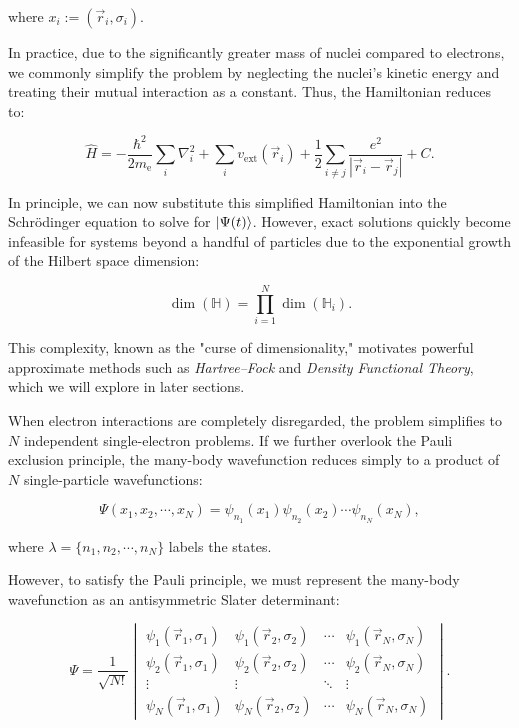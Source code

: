 where $x_i:=(\vec{r}_i,\sigma_i)$.

In practice, due to the significantly greater mass of nuclei compared to electrons, we commonly simplify the problem by neglecting the nuclei’s kinetic energy and treating their mutual interaction as a constant. Thus, the Hamiltonian reduces to:

\begin{equation}
    \hat{H}=-\frac{\hbar^2}{2m_\mathrm{e}}\sum_i\nabla_i^2
    +\sum_i v_\text{ext}(\vec{r}_i)
    +\frac{1}{2}\sum_{i\neq j}\frac{e^2}{|\vec{r}_i-\vec{r}_j|}+C.
    \label{many_body_hamiltonian_simplified}
\end{equation}

In principle, we can now substitute this simplified Hamiltonian into the Schrödinger equation to solve for $\ket{\Psi(t)}$. However, exact solutions quickly become infeasible for systems beyond a handful of particles due to the exponential growth of the Hilbert space dimension:

\begin{equation}
    \dim(\mathbb{H})=\prod_{i=1}^{N} \dim(\mathbb{H}_i).
    \label{exponential_growth}
\end{equation}

This complexity, known as the "curse of dimensionality," motivates powerful approximate methods such as \textit{Hartree--Fock} and \textit{Density Functional Theory}, which we will explore in later sections.

When electron interactions are completely disregarded, the problem simplifies to $N$ independent single-electron problems. If we further overlook the Pauli exclusion principle, the many-body wavefunction reduces simply to a product of $N$ single-particle wavefunctions:

\begin{equation}
    \Psi(x_1,x_2,\cdots,x_N)=\psi_{n_1}(x_1)\psi_{n_2}(x_2)\cdots\psi_{n_N}(x_N),
    \label{independent_body_function}
\end{equation}

where $\lambda=\{n_1,n_2,\cdots,n_N\}$ labels the states.

However, to satisfy the Pauli principle, we must represent the many-body wavefunction as an antisymmetric Slater determinant:

\begin{equation}
    \Psi = \frac{1}{\sqrt{N!}}
    \begin{vmatrix}
    \psi_1(\vec{r}_1,\sigma_1) & \psi_1(\vec{r}_2,\sigma_2) & \cdots & \psi_1(\vec{r}_N,\sigma_N)\\
    \psi_2(\vec{r}_1,\sigma_1) & \psi_2(\vec{r}_2,\sigma_2) & \cdots & \psi_2(\vec{r}_N,\sigma_N)\\
    \vdots & \vdots & \ddots & \vdots\\
    \psi_N(\vec{r}_1,\sigma_1) & \psi_N(\vec{r}_2,\sigma_2) & \cdots & \psi_N(\vec{r}_N,\sigma_N)
    \end{vmatrix}.
    \label{slater_determinant}
\end{equation}

